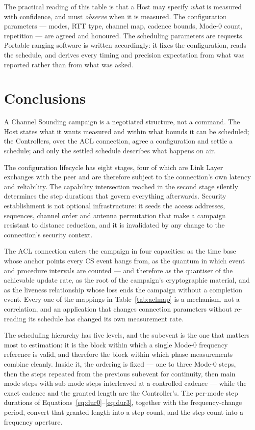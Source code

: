 \documentclass[11pt,a4paper]{article}
\begin{document}
The practical reading of this table is that a Host may specify \emph{what} is measured with
confidence, and must \emph{observe} when it is measured. The configuration parameters --- modes, RTT
type, channel map, cadence bounds, Mode-0 count, repetition --- are agreed and honoured. The
scheduling parameters are requests. Portable ranging software is written accordingly: it fixes the
configuration, reads the schedule, and derives every timing and precision expectation from what was
reported rather than from what was asked.

\section{Conclusions}

A Channel Sounding campaign is a negotiated structure, not a command. The Host states what it wants
measured and within what bounds it can be scheduled; the Controllers, over the ACL connection, agree a
configuration and settle a schedule; and only the settled schedule describes what happens on air.

The configuration lifecycle has eight stages, four of which are Link Layer exchanges with the peer and
are therefore subject to the connection's own latency and reliability. The capability intersection
reached in the second stage silently determines the step durations that govern everything afterwards.
Security establishment is not optional infrastructure: it seeds the access addresses, sequences,
channel order and antenna permutation that make a campaign resistant to distance reduction, and it is
invalidated by any change to the connection's security context.

The ACL connection enters the campaign in four capacities: as the time base whose anchor points every
CS event hangs from, as the quantum in which event and procedure intervals are counted --- and
therefore as the quantiser of the achievable update rate, as the root of the campaign's cryptographic
material, and as the liveness relationship whose loss ends the campaign without a completion event.
Every one of the mappings in Table~\ref{tab:aclmap} is a mechanism, not a correlation, and an
application that changes connection parameters without re-reading its schedule has changed its own
measurement rate.

The scheduling hierarchy has five levels, and the subevent is the one that matters most to
estimation: it is the block within which a single Mode-0 frequency reference is valid, and therefore
the block within which phase measurements combine cleanly. Inside it, the ordering is fixed --- one
to three Mode-0 steps, then the steps repeated from the previous subevent for continuity, then main
mode steps with sub mode steps interleaved at a controlled cadence --- while the exact cadence and
the granted length are the Controller's. The per-mode step durations of
Equations~\eqref{eq:dur0}--\eqref{eq:dur3}, together with the frequency-change period, convert that
granted length into a step count, and the step count into a frequency aperture.
\end{document}
